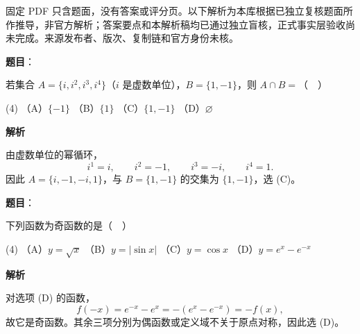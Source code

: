 

\begin{gktip}
固定 PDF 只含题面，没有答案或评分页。以下解析为本库根据已独立复核题面所作推导，非官方解析；答案要点和本解析稿均已通过独立盲核，正式事实层验收尚未完成。来源发布者、版次、复制链和官方身份未核。
\end{gktip}

\begin{answer}

\textbf{题目}：

若集合 $A=\{i,i^2,i^3,i^4\}$（$i$ 是虚数单位），$B=\{1,-1\}$，则 $A\cap B=$（　）

\begin{gkopts}(4)
\task （A）$\{-1\}$
\task （B）$\{1\}$
\task （C）$\{1,-1\}$
\task （D）$\varnothing$
\end{gkopts}

\textbf{解析}

由虚数单位的幂循环，
\nopagebreak[4]
\[
i^1=i,\qquad i^2=-1,\qquad i^3=-i,\qquad i^4=1.
\]
因此 $A=\{i,-1,-i,1\}$，与 $B=\{1,-1\}$ 的交集为 $\{1,-1\}$，选 (C)。


\end{answer}
\begin{answer}

\textbf{题目}：

下列函数为奇函数的是（　）

\begin{gkopts}(4)
\task （A）$y=\sqrt{x}$
\task （B）$y=|\sin x|$
\task （C）$y=\cos x$
\task （D）$y=e^x-e^{-x}$
\end{gkopts}

\textbf{解析}

对选项 (D) 的函数，
\nopagebreak[4]
\[
f(-x)=e^{-x}-e^x=-(e^x-e^{-x})=-f(x),
\]
故它是奇函数。其余三项分别为偶函数或定义域不关于原点对称，因此选 (D)。


\end{answer}
